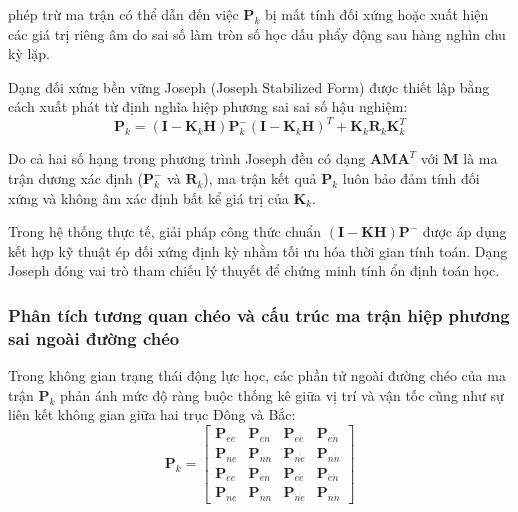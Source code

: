 phép trừ ma trận có thể dẫn đến việc $\mathbf{P}_k$ bị mất tính đối xứng hoặc xuất hiện các giá trị riêng âm do sai số làm tròn số học dấu phẩy động sau hàng nghìn chu kỳ lặp.

Dạng đối xứng bền vững Joseph (Joseph Stabilized Form) được thiết lập bằng cách xuất phát từ định nghĩa hiệp phương sai sai số hậu nghiệm:
\begin{equation}
\mathbf{P}_k = (\mathbf{I} - \mathbf{K}_k \mathbf{H}) \mathbf{P}_k^- (\mathbf{I} - \mathbf{K}_k \mathbf{H})^T + \mathbf{K}_k \mathbf{R}_k \mathbf{K}_k^T
\label{eq:joseph-stabilized-form}
\end{equation}

Do cả hai số hạng trong phương trình Joseph đều có dạng $\mathbf{A} \mathbf{M} \mathbf{A}^T$ với $\mathbf{M}$ là ma trận dương xác định ($\mathbf{P}_k^-$ và $\mathbf{R}_k$), ma trận kết quả $\mathbf{P}_k$ luôn bảo đảm tính đối xứng và không âm xác định bất kể giá trị của $\mathbf{K}_k$.

Trong hệ thống thực tế, giải pháp công thức chuẩn $(\mathbf{I}-\mathbf{K}\mathbf{H})\mathbf{P}^-$ được áp dụng kết hợp kỹ thuật ép đối xứng định kỳ nhằm tối ưu hóa thời gian tính toán. Dạng Joseph đóng vai trò tham chiếu lý thuyết để chứng minh tính ổn định toán học.

\subsubsection{Phân tích tương quan chéo và cấu trúc ma trận hiệp phương sai ngoài đường chéo}

\hspace{0.5cm} Trong không gian trạng thái động lực học, các phần tử ngoài đường chéo của ma trận $\mathbf{P}_k$ phản ánh mức độ ràng buộc thống kê giữa vị trí và vận tốc cũng như sự liên kết không gian giữa hai trục Đông và Bắc:
\begin{equation}
\mathbf{P}_k = \begin{bmatrix}
\mathbf{P}_{ee} & \mathbf{P}_{en} & \mathbf{P}_{e\dot{e}} & \mathbf{P}_{e\dot{n}} \\
\mathbf{P}_{ne} & \mathbf{P}_{nn} & \mathbf{P}_{n\dot{e}} & \mathbf{P}_{n\dot{n}} \\
\mathbf{P}_{\dot{e}e} & \mathbf{P}_{\dot{e}n} & \mathbf{P}_{\dot{e}\dot{e}} & \mathbf{P}_{\dot{e}\dot{n}} \\
\mathbf{P}_{\dot{n}e} & \mathbf{P}_{\dot{n}n} & \mathbf{P}_{\dot{n}\dot{e}} & \mathbf{P}_{\dot{n}\dot{n}}
\end{bmatrix}
\label{eq:full-covariance-matrix-structure}
\end{equation}


